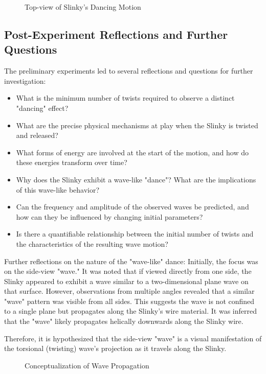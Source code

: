 \documentclass{mcmthesis}  %
\begin{document}
\begin{figure}[h!]
    \centering
    \caption{Top-view of Slinky's Dancing Motion}
    \label{fig:top_view_phenomena}
\end{figure}

\subsection{Post-Experiment Reflections and Further Questions} %
The preliminary experiments led to several reflections and questions for further investigation:
\begin{itemize}
    \item What is the minimum number of twists required to observe a distinct "dancing" effect?
    \item What are the precise physical mechanisms at play when the Slinky is twisted and released?
    \item What forms of energy are involved at the start of the motion, and how do these energies transform over time?
    \item Why does the Slinky exhibit a wave-like "dance"? What are the implications of this wave-like behavior?
    \item Can the frequency and amplitude of the observed waves be predicted, and how can they be influenced by changing initial parameters?
    \item Is there a quantifiable relationship between the initial number of twists and the characteristics of the resulting wave motion?
\end{itemize}

Further reflections on the nature of the "wave-like" dance:
Initially, the focus was on the side-view "wave." It was noted that if viewed directly from one side, the Slinky appeared to exhibit a wave similar to a two-dimensional plane wave on that surface. However, observations from multiple angles revealed that a similar "wave" pattern was visible from all sides. This suggests the wave is not confined to a single plane but propagates along the Slinky's wire material. It was inferred that the "wave" likely propagates helically downwards along the Slinky wire.

Therefore, it is hypothesized that the side-view "wave" is a visual manifestation of the torsional (twisting) wave's projection as it travels along the Slinky.

\begin{figure}[h!]
    \centering
    \caption{Conceptualization of Wave Propagation}
    \label{fig:wave_reflection}
\end{figure}
\end{document}
